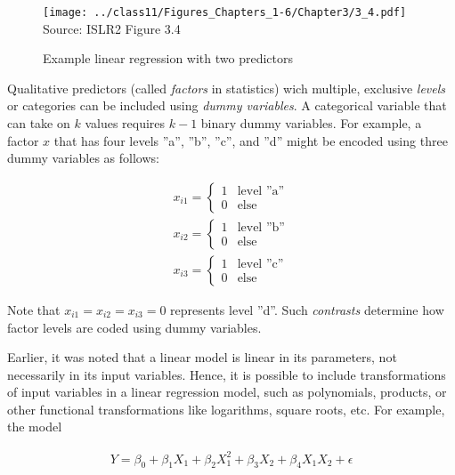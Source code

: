 \begin{figure}
\centering
\texttt{[image: ../class11/Figures\_Chapters\_1-6/Chapter3/3\_4.pdf]}  \\

\scriptsize Source: ISLR2 Figure 3.4
\caption{Example linear regression with two predictors}
\label{fig:plane}
\end{figure}

Qualitative predictors (called \emph{factors} in statistics) wich multiple, exclusive \emph{levels} or categories can be included using \emph{dummy variables}. A categorical variable that can take on $k$ values requires $k-1$ binary dummy variables. For example, a factor $x$ that has four levels ''a'', ''b'', ''c'', and ''d'' might be encoded using three dummy variables as follows:

\begin{align*}
x_{i1} = \begin{cases}
1 & \text{level ''a''} \\
0 & \text{else}
\end{cases} \\
x_{i2} = \begin{cases}
1 & \text{level ''b''} \\
0 & \text{else}
\end{cases} \\
x_{i3} = \begin{cases}
1 & \text{level ''c''} \\
0 & \text{else}
\end{cases}
\end{align*}

\noindent Note that $x_{i1} = x_{i2} = x_{i3} = 0$ represents level ''d''. Such \emph{contrasts} determine how factor levels are coded using dummy variables.

Earlier, it was noted that a linear model is linear in its parameters, not necessarily in its input variables. Hence, it is possible to include transformations of input variables in a linear regression model, such as polynomials, products, or other functional transformations like logarithms, square roots, etc. For example, the model

\begin{align*}
Y = \beta_0 + \beta_1 X_1 + \beta_2 X_1^2 + \beta_3 X_2 + \beta_4 X_1 X_2 + \epsilon
\end{align*}

